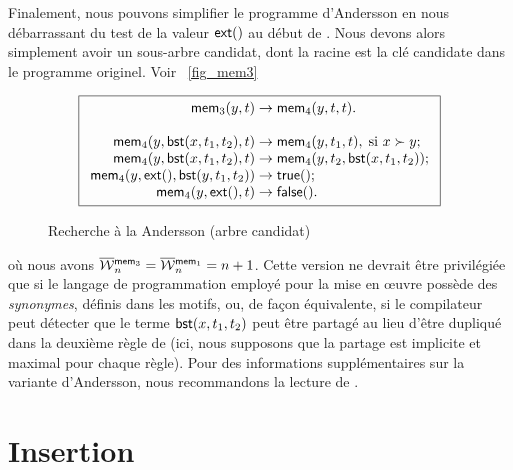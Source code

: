 Finalement, nous pouvons simplifier le programme d'Andersson en nous
débarrassant du test de la valeur \(\textsf{ext}()\) au début de
. Nous devons alors
simplement avoir un sous-arbre candidat, dont la racine est la clé
candidate dans le programme originel. Voir \fig~\vref{fig_mem3}
\begin{figure}
\begin{equation*}
\boxed{
\begin{array}{r@{\;}l@{\;}l}
  \fun{mem}_3(y,t) & \rightarrow & \fun{mem}_4(y,t,t).\\
  \\
  \fun{mem}_4(y,\fun{bst}(x,t_1,t_2),t) & \rightarrow &
  \fun{mem}_4(y,t_1,t),\; \text{si \(x \succ y\)};\\
\fun{mem}_4(y,\fun{bst}(x,t_1,t_2),t) & \rightarrow &
  \fun{mem}_4(y,t_2,\fun{bst}(x,t_1,t_2));\\
\fun{mem}_4(y,\fun{ext}(),\fun{bst}(y,t_1,t_2)) & \rightarrow & \fun{true}();\\
\fun{mem}_4(y,\fun{ext}(),t) & \rightarrow & \fun{false}().
\end{array}}
\end{equation*}
\caption{Recherche à la Andersson (arbre candidat)\label{fig_mem3}}
\end{figure}
où nous avons \(\OW{\fun{mem}_3}{n} = \OW{\fun{mem}_1}{n} = n + 1\).
Cette version ne devrait être privilégiée que si le langage de
programmation employé pour la mise en {\oe}uvre possède des
\emph{synonymes}, définis dans les motifs, ou,
de façon équivalente, si le compilateur peut détecter que le terme
\(\textsf{bst}(x,t_1,t_2)\) peut être partagé au lieu d'être dupliqué
dans la deuxième règle de  (ici, nous supposons que
la partage est implicite et maximal pour chaque
règle). Pour des informations
supplémentaires sur la variante d'Andersson, nous recommandons la
lecture de \cite{Spuler_1992}.


\section{Insertion}
\label{sec_bst_insertion}


